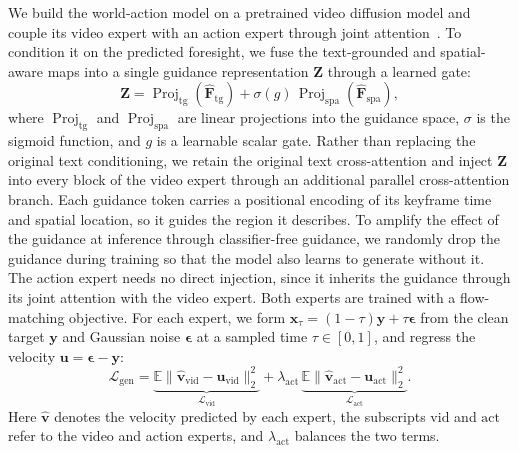We build the world-action model on a pretrained video diffusion model and couple
its video expert with an action expert through joint
attention~\cite{genieenvisioner,fastwam}.
To condition it on the predicted foresight, we fuse the text-grounded and
spatial-aware maps into a single guidance representation $\mathbf{Z}$ through a
learned gate:
\begin{equation}
    \mathbf{Z}
    =
    \operatorname{Proj}_{\mathrm{tg}}(\hat{\mathbf{F}}_{\mathrm{tg}})
    +
    \sigma(g)\,
    \operatorname{Proj}_{\mathrm{spa}}(\hat{\mathbf{F}}_{\mathrm{spa}}),
    \label{eq:fusion}
\end{equation}
where $\operatorname{Proj}_{\mathrm{tg}}$ and $\operatorname{Proj}_{\mathrm{spa}}$ are
linear projections into the guidance space, $\sigma$ is the sigmoid function, and
$g$ is a learnable scalar gate.
Rather than replacing the original text conditioning, we retain the original text cross-attention and inject $\mathbf{Z}$ into every block of the video expert through an additional parallel cross-attention branch. 
Each guidance token carries a positional encoding of its keyframe time and spatial
location, so it guides the region it describes.
To amplify the effect of the guidance at inference through classifier-free
guidance, we randomly drop the guidance during training so that the model also
learns to generate without it.
The action expert needs no direct injection, since it inherits the guidance
through its joint attention with the video expert.
Both experts are trained with a flow-matching objective.
For each expert, we form $\mathbf{x}_\tau=(1-\tau)\mathbf{y}+\tau\boldsymbol{\epsilon}$
from the clean target $\mathbf{y}$ and Gaussian noise $\boldsymbol{\epsilon}$ at a
sampled time $\tau\in[0,1]$, and regress the velocity
$\mathbf{u}=\boldsymbol{\epsilon}-\mathbf{y}$:
\begin{equation}
    \mathcal{L}_{\mathrm{gen}}
    =
    \underbrace{\mathbb{E}\big\|\hat{\mathbf{v}}_{\mathrm{vid}}-\mathbf{u}_{\mathrm{vid}}\big\|_2^2}_{\mathcal{L}_{\mathrm{vid}}}
    +
    \lambda_{\mathrm{act}}\,
    \underbrace{\mathbb{E}\big\|\hat{\mathbf{v}}_{\mathrm{act}}-\mathbf{u}_{\mathrm{act}}\big\|_2^2}_{\mathcal{L}_{\mathrm{act}}}.
    \label{eq:gen_loss}
\end{equation}
Here $\hat{\mathbf{v}}$ denotes the velocity predicted by each expert, the
subscripts $\mathrm{vid}$ and $\mathrm{act}$ refer to the video and action
experts, and $\lambda_{\mathrm{act}}$ balances the two terms.

